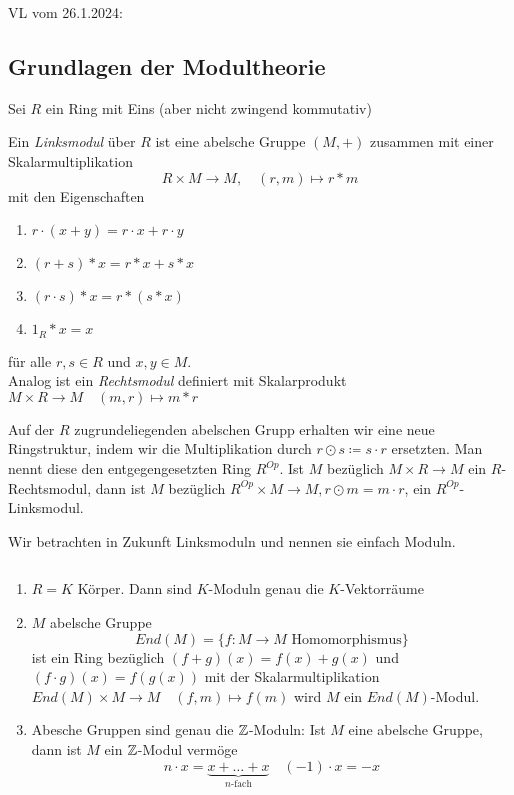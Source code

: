 \documentclass[../main.tex]{subfiles}
\begin{document}
\begin{flushright}
VL vom 26.1.2024:
\end{flushright}
\subsection{Grundlagen der Modultheorie}
Sei $R$ ein Ring mit Eins (aber nicht zwingend kommutativ)

\begin{definition}
    Ein \emph{Linksmodul} über $R$ ist eine abelsche Gruppe $(M,+)$ zusammen mit einer Skalarmultiplikation
    $$R\times M\rightarrow M,\quad (r,m)\mapsto r * m$$
    mit den Eigenschaften
    \begin{enumerate}[label=(\roman*)]
        \item $r\cdot (x+y) = r\cdot x + r\cdot y$
        \item $(r+s)* x = r * x + s * x$
        \item $(r\cdot s) * x = r * (s*x)$
        \item $1_R * x = x$
    \end{enumerate}
    für alle $r,s\in R$ und $x,y\in M$.\\
    Analog ist ein \emph{Rechtsmodul} definiert mit Skalarprodukt $M\times R\rightarrow M\quad (m,r)\mapsto m * r$
\end{definition}

\begin{remark}
    Auf der $R$ zugrundeliegenden abelschen Grupp erhalten wir eine neue Ringstruktur, indem wir die Multiplikation durch $r\odot s \coloneqq s\cdot r$ ersetzten.
    Man nennt diese den entgegengesetzten Ring $R^{Op}$. Ist $M$ bezüglich $M\times R\rightarrow M$ ein $R$-Rechtsmodul, dann ist $M$ bezüglich $R^{Op}\times M\rightarrow M, r\odot m= m\cdot r$, ein $R^{Op}$-Linksmodul.
\end{remark}
Wir betrachten in Zukunft Linksmoduln und nennen sie einfach Moduln.
\begin{example} $ $
    \begin{enumerate}[label=(\arabic*)]
        \item $R=K$ Körper. Dann sind $K$-Moduln genau die $K$-Vektorräume
        \item $M$ abelsche Gruppe
        $$End(M) = \{f:M\rightarrow M \text{ Homomorphismus}\}$$
        ist ein Ring bezüglich $(f+g)(x) = f(x) + g(x)$ und $(f\cdot g)(x) = f(g(x))$ mit der Skalarmultiplikation $End(M)\times M \rightarrow M\quad (f,m)\mapsto f(m)$ wird $M$ ein $End(M)$-Modul.
        \item Abesche Gruppen sind genau die $\mathbb{Z}$-Moduln:
        Ist $M$ eine abelsche Gruppe, dann ist $M$ ein $\mathbb{Z}$-Modul vermöge
        $$n\cdot x = \underbrace{x+\dots+x}_{n\text{-fach}} \quad (-1)\cdot x = -x$$
    \end{enumerate}
\end{example}
\end{document}
